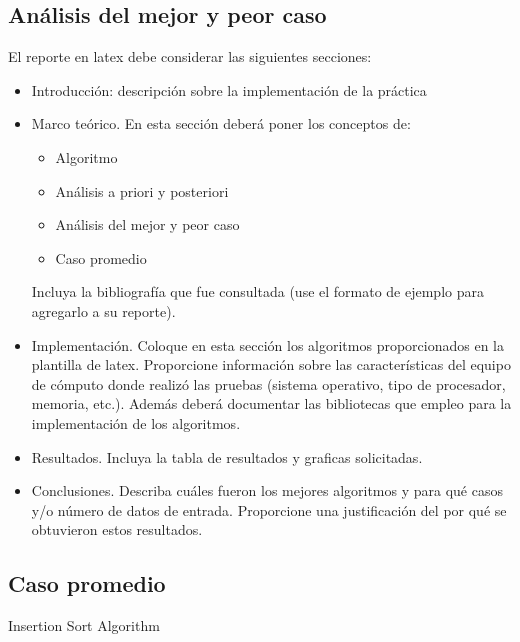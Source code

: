 \documentclass[conference]{IEEEtran}
\begin{document}
\subsection{An\'alisis del mejor y peor caso}

El reporte en latex debe considerar las siguientes secciones:

\begin{itemize}
\item Introducci\'on: descripci\'on sobre la implementaci\'on de la pr\'actica
\item Marco te\'orico. En esta secci\'on deber\'a poner los conceptos de:
\begin{itemize}
	\item Algoritmo
	\item An\'alisis a priori y posteriori
	\item An\'alisis del mejor y peor caso
	\item Caso promedio
\end{itemize}
Incluya la bibliograf\'ia que fue consultada (use el formato de ejemplo para agregarlo a su reporte).
\item Implementaci\'on. Coloque en esta secci\'on los algoritmos proporcionados en la plantilla de latex. Proporcione informaci\'on sobre las caracter\'isticas del equipo de c\'omputo donde realiz\'o las pruebas (sistema operativo, tipo de procesador, memoria, etc.).
Adem\'as deber\'a documentar las bibliotecas que empleo para la implementaci\'on de los algoritmos.
\item Resultados. Incluya la tabla de resultados y graficas solicitadas.
\item Conclusiones. Describa cu\'ales fueron los mejores algoritmos y para qu\'e casos y/o n\'umero de datos de entrada. Proporcione una justificaci\'on del por qu\'e se obtuvieron estos resultados. 
\end{itemize} 

\subsection{Caso promedio}

\begin{algorithm}[h]
\caption{Insertion Sort Algorithm}
\label{merge}
\end{algorithm}
\end{document}
